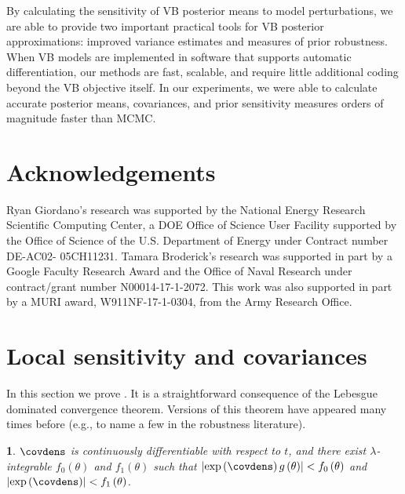 \documentclass{article}\usepackage[]{graphicx}\usepackage[]{color}
\theoremstyle{plain}
\theoremstyle{definition}
\theoremstyle{plain}
\theoremstyle{plain}
\newtheorem{assumption}[thm]{\protect\assumptionname}
\theoremstyle{plain}
\theoremstyle{plain}
\providecommand{\assumptionname}{Assumption}
\begin{document}
By calculating the sensitivity of VB posterior means to model perturbations,
we are able to provide two important practical tools for VB posterior
approximations: improved variance estimates and measures of prior
robustness. When VB models are implemented in software that supports
automatic differentiation, our methods are fast, scalable, and require
little additional coding beyond the VB objective itself. In our experiments,
we were able to calculate accurate posterior means, covariances, and
prior sensitivity measures orders of magnitude faster than MCMC.

\section{Acknowledgements}

Ryan Giordano's research was supported by the National Energy Research
Scientific Computing Center, a DOE Office of Science User Facility
supported by the Office of Science of the U.S. Department of Energy
under Contract number DE-AC02- 05CH11231. Tamara Broderick's research
was supported in part by a Google Faculty Research Award and the Office
of Naval Research under contract/grant number N00014-17-1-2072. This
work was also supported in part by a MURI award, W911NF-17-1-0304,
from the Army Research Office.

\clearpage{}




\clearpage{}


\appendix
\appendixpage

\section{Local sensitivity and covariances\label{app:sens_and_cov}}

In this section we prove . It is a straightforward
consequence of the Lebesgue dominated convergence theorem. Versions
of this theorem have appeared many times before (e.g., \citet{diaconis:1986:consistency,basu:1996:local,gustafson:1996:localposterior,perez:2006:mcmc}
to name a few in the robustness literature).
\begin{assumption}
$\covdens$ is continuously differentiable with respect to $t$, and
there exist $\lambda$-integrable $f_{0}\left(\theta\right)$ and
$f_{1}\left(\theta\right)$ such that $\left|\exp\left(\covdens\right)g\left(\theta\right)\right|<f_{0}\left(\theta\right)$
and $\left|\exp\left(\covdens\right)\right|<f_{1}\left(\theta\right)$.\label{assu:exchange_order}
\end{assumption}
\end{document}
